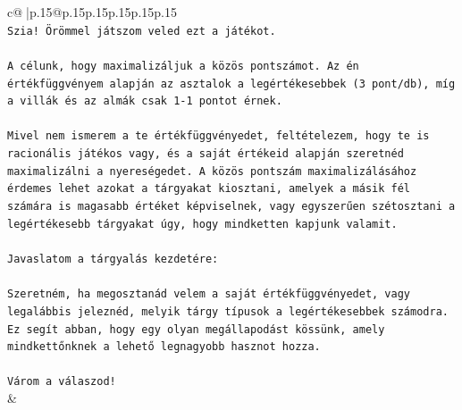 \documentclass{article}
\begin{document}
{\begin{supertabular}{c@{$\;$}|p{.15\linewidth}@{}p{.15\linewidth}p{.15\linewidth}p{.15\linewidth}p{.15\linewidth}p{.15\linewidth}}
{{{\\ 
\texttt{Szia! Örömmel játszom veled ezt a játékot.} \\
\\ 
\texttt{A célunk, hogy maximalizáljuk a közös pontszámot. Az én értékfüggvényem alapján az asztalok a legértékesebbek (3 pont/db), míg a villák és az almák csak 1{-}1 pontot érnek.} \\
\\ 
\texttt{Mivel nem ismerem a te értékfüggvényedet, feltételezem, hogy te is racionális játékos vagy, és a saját értékeid alapján szeretnéd maximalizálni a nyereségedet. A közös pontszám maximalizálásához érdemes lehet azokat a tárgyakat kiosztani, amelyek a másik fél számára is magasabb értéket képviselnek, vagy egyszerűen szétosztani a legértékesebb tárgyakat úgy, hogy mindketten kapjunk valamit.} \\
\\ 
\texttt{Javaslatom a tárgyalás kezdetére:} \\
\\ 
\texttt{Szeretném, ha megosztanád velem a saját értékfüggvényedet, vagy legalábbis jeleznéd, melyik tárgy típusok a legértékesebbek számodra. Ez segít abban, hogy egy olyan megállapodást kössünk, amely mindkettőnknek a lehető legnagyobb hasznot hozza.} \\
\\ 
\texttt{Várom a válaszod!} \\
            }
        }
    }
    & \\ \\


\end{supertabular}}
\end{document}

